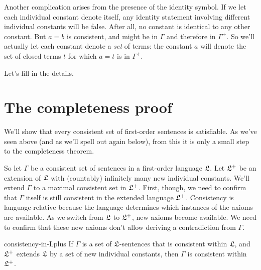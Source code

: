 Another complication arises from the presence of the identity symbol.
If we let each individual constant denote itself,
any identity statement involving different individual constants will be false.
After all,
no constant is identical to any other constant.
But $a=b$ is consistent,
and might be in $\Gamma$ and therefore in $\Gamma^{+}$.
So we'll actually let each constant denote a \emph{set} of terms:
the constant $a$ will denote the set of closed terms $t$ for which
$a=t$ is in $\Gamma^{+}$.

Let's fill in the details.

\section{The completeness proof}

We'll show that every consistent set of first-order sentences is satisfiable.
As we've seen above
(and as we'll spell out again below),
from this it is only a small step to the completeness theorem.

So let $\Gamma$ be a consistent set of sentences in a first-order language $\mathfrak{L}$.
Let $\mathfrak{L}^{+}$ be an extension of $\mathfrak{L}$ with (countably) infinitely many new individual constants.
We'll extend $\Gamma$ to a maximal consistent set in $\mathfrak{L}^{+}$.
First,
though,
we need to confirm that
$\Gamma$ itself is still consistent in the extended language $\mathfrak{L}^{+}$.
Consistency is language-relative because
the language determines which instances of the axioms are available.
As we switch from $\mathfrak{L}$ to $\mathfrak{L}^{+}$,
new axioms become available.
We need to confirm that
these new axioms don't allow deriving a contradiction from $\Gamma$.

\begin{lemma}{}{consistency-in-Lplus}
  If $\Gamma$ is a set of $\mathfrak{L}$-sentences that is consistent within $\mathfrak{L}$,
  and $\mathfrak{L}^{+}$ extends $\mathfrak{L}$ by a set of new individual constants,
  then $\Gamma$ is consistent within $\mathfrak{L}^{+}$.
\end{lemma}

